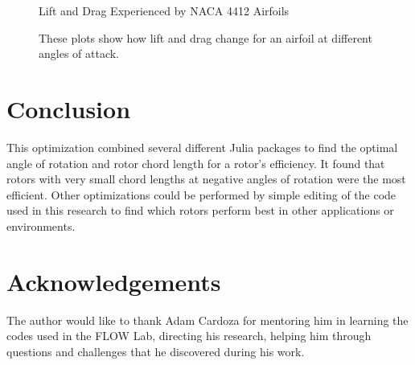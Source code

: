 \documentclass[journal ]{new-aiaa}
\begin{document}
\begin{figure}[H]
\centering
	\caption{Lift and Drag Experienced by NACA 4412 Airfoils}
	\captionsetup{aboveskip=0pt,font=it}
	\caption*{These plots show how lift and drag change for an airfoil at different angles of attack.}
	\label{fig:8}
\end{figure}


\section{Conclusion}

This optimization combined several different Julia packages to find the optimal angle of rotation and rotor chord length for a rotor's efficiency. It found that rotors with very small chord lengths at negative angles of rotation were the most efficient. Other optimizations could be performed by simple editing of the code used in this research to find which rotors perform best in other applications or environments. 


\section{Acknowledgements}

The author would like to thank Adam Cardoza for mentoring him in learning the codes used in the FLOW Lab, directing his research, helping him through questions and challenges that he discovered during his work.




\end{document}

